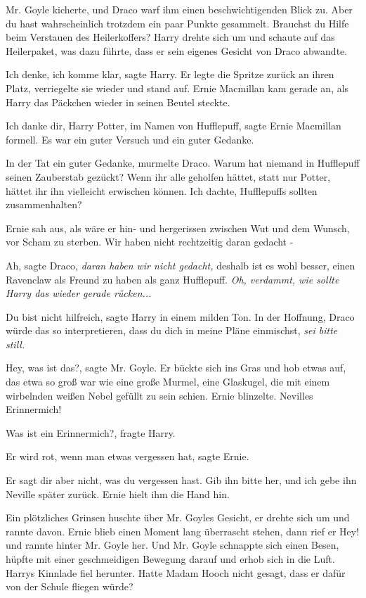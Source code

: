 Mr. Goyle kicherte, und Draco warf ihm einen beschwichtigenden Blick zu. \glqq
Aber du hast wahrscheinlich trotzdem ein paar Punkte gesammelt. Brauchst du
Hilfe beim Verstauen des Heilerkoffers?\grqq{} Harry drehte sich um und schaute
auf das Heilerpaket, was dazu führte, dass er sein eigenes Gesicht von Draco
abwandte.

\glqq Ich denke, ich komme klar\grqq{}, sagte Harry. Er legte die Spritze zurück
an ihren Platz, verriegelte sie wieder und stand auf. Ernie Macmillan kam gerade
an, als Harry das Päckchen wieder in seinen Beutel steckte.

\glqq Ich danke dir, Harry Potter, im Namen von Hufflepuff\grqq{}, sagte Ernie
Macmillan formell. \glqq Es war ein guter Versuch und ein guter Gedanke.\grqq{}

\glqq In der Tat ein guter Gedanke\grqq{}, murmelte Draco. \glqq Warum hat
niemand in Hufflepuff seinen Zauberstab gezückt? Wenn ihr alle geholfen hättet,
statt nur Potter, hättet ihr ihn vielleicht erwischen können. Ich dachte,
Hufflepuffs sollten zusammenhalten?\grqq{}

Ernie sah aus, als wäre er hin- und hergerissen zwischen Wut und dem Wunsch, vor
Scham zu sterben. \glqq Wir haben nicht rechtzeitig daran gedacht -\grqq{}

\glqq Ah\grqq{}, sagte Draco, \glqq \emph{daran haben wir nicht gedacht,}
deshalb ist es wohl besser, einen Ravenclaw als Freund zu haben als ganz
Hufflepuff.\grqq{} \emph{Oh, verdammt, wie sollte Harry das wieder gerade
rücken...}

\glqq Du bist nicht hilfreich\grqq{}, sagte Harry in einem milden Ton. In der
Hoffnung, Draco würde das so interpretieren, dass du dich in meine Pläne
einmischst, \emph{sei bitte still.}

\glqq Hey, was ist das?\grqq{}, sagte Mr. Goyle. Er bückte sich ins Gras und hob
etwas auf, das etwa so groß war wie eine große Murmel, eine Glaskugel, die mit
einem wirbelnden weißen Nebel gefüllt zu sein schien. Ernie blinzelte. \glqq
Nevilles Erinnermich!\grqq{}

\glqq Was ist ein Erinnermich?\grqq{}, fragte Harry.

\glqq Er wird rot, wenn man etwas vergessen hat\grqq{}, sagte Ernie.

\glqq Er sagt dir aber nicht, was du vergessen hast. Gib ihn bitte her, und ich
gebe ihn Neville später zurück.\grqq{} Ernie hielt ihm die Hand hin.

Ein plötzliches Grinsen huschte über Mr. Goyles Gesicht, er drehte sich um und
rannte davon. Ernie blieb einen Moment lang überrascht stehen, dann rief er
\glqq Hey!\grqq{} und rannte hinter Mr. Goyle her. Und Mr. Goyle schnappte sich
einen Besen, hüpfte mit einer geschmeidigen Bewegung darauf und erhob sich in
die Luft. Harrys Kinnlade fiel herunter. Hatte Madam Hooch nicht gesagt, dass er
dafür von der Schule fliegen würde?

